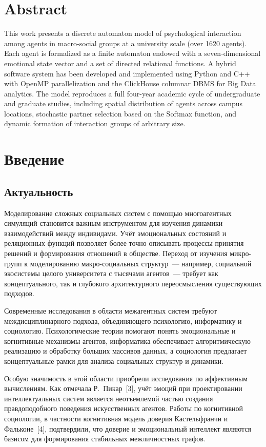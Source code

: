 \documentclass[12pt]{article}
\begin{document}
\section*{Abstract}
This work presents a discrete automaton model of psychological interaction among agents in macro-social groups at a university scale (over 1620 agents). Each agent is formalized as a finite automaton endowed with a seven-dimensional emotional state vector and a set of directed relational functions. A hybrid software system has been developed and implemented using Python and C++ with OpenMP parallelization and the ClickHouse columnar DBMS for Big Data analytics. The model reproduces a full four-year academic cycle of undergraduate and graduate studies, including spatial distribution of agents across campus locations, stochastic partner selection based on the Softmax function, and dynamic formation of interaction groups of arbitrary size.

\clearpage
\tableofcontents
\clearpage

\clearpage
\section{Введение}

\subsection*{Актуальность}
Моделирование сложных социальных систем с помощью многоагентных симуляций становится важным инструментом для изучения динамики взаимодействий между индивидами. Учёт эмоциональных состояний и реляционных функций позволяет более точно описывать процессы принятия решений и формирования отношений в обществе. Переход от изучения микро-групп к моделированию макро-социальных структур~--- например, социальной экосистемы целого университета с тысячами агентов~--- требует как концептуального, так и глубокого архитектурного переосмысления существующих подходов.

Современные исследования в области межагентных систем требуют междисциплинарного подхода, объединяющего психологию, информатику и социологию. Психологические теории помогают понять эмоциональные и когнитивные механизмы агентов, информатика обеспечивает алгоритмическую реализацию и обработку больших массивов данных, а социология предлагает концептуальные рамки для анализа социальных структур и динамики.

Особую значимость в этой области приобрели исследования по аффективным вычислениям. Как отмечала Р.~Пикар~[3], учёт эмоций при проектировании интеллектуальных систем является неотъемлемой частью создания правдоподобного поведения искусственных агентов. Работы по когнитивной социологии, в частности когнитивная модель доверия Кастельфранчи и Фальконе~[4], подтвердили, что доверие и эмоциональный интеллект являются базисом для формирования стабильных межличностных графов.
\end{document}
